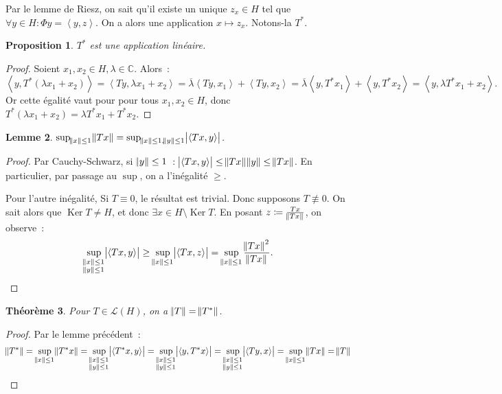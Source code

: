 \documentclass{report}
\DeclareMathOperator{\Ker}{Ker}
\newcommand{\C}{{\mathbb C}}
\newcommand{\scpr}[2]{\left\langle#1, #2\right\rangle}
\newtheorem{thm}{Théorème}[chapter]
\newtheorem{prp}[thm]{Proposition}
\newtheorem{lem}[thm]{Lemme}
\theoremstyle{definition}
\theoremstyle{remark}
\begin{document}
Par le lemme de Riesz, on sait qu'il existe un unique $z_x \in H$ tel que $\forall y \in H : \Phi y = \scpr y{z}$. On a alors une application $x \mapsto z_x$. Notons-la $T^*$.

\begin{prp} $T^*$ est une application linéaire.
\end{prp}

\begin{proof} Soient $x_1, x_2 \in H, \lambda \in \C$. Alors~:
\[\scpr y{T^*(\lambda x_1 + x_2)} = \scpr {Ty}{\lambda x_1 + x_2} = \overline \lambda \scpr {Ty}{x_1} + \scpr {Ty}{x_2} = \overline \lambda\scpr y{T^*x_1} + \scpr y{T^*x_2}
= \scpr y{\lambda T^*x_1 + x_2}.\]
Or cette égalité vaut pour pour tous $x_1, x_2 \in H$, donc $T^*(\lambda x_1 + x_2) = \lambda T^*x_1 + T^*x_2$.
\end{proof}

\begin{lem} $\sup_{\norm x \leq 1}\norm {Tx} = \sup_{\norm x \leq 1, \norm y \leq 1}\abs {\scpr {Tx}y}$.
\end{lem}

\begin{proof} Par Cauchy-Schwarz, si $\norm y \leq 1$~: $\abs {\scpr {Tx}y} \leq \norm {Tx}\norm y \leq \norm {Tx}$. En particulier, par passage au $\sup$, on a
l'inégalité $\geq$.

Pour l'autre inégalité, Si $T \equiv 0$, le résultat est trivial. Donc supposons $T \not \equiv 0$. On sait alors que $\Ker T \neq H$, et donc $\exists x \in H \setminus \Ker T$.
En posant $z \coloneqq \frac {Tx}{\norm {Tx}}$, on observe~:
\[\sup_{\substack {\norm x \leq 1 \\ \norm y \leq 1}}\abs {\scpr {Tx}y} \geq \sup_{\norm x \leq 1}\abs {\scpr {Tx}z} = \sup_{\norm x \leq 1}\frac {\norm {Tx}^2}{\norm {Tx}}.\]
\end{proof}

\begin{thm} Pour $T \in \mathcal L(H)$, on a $\norm T = \norm {T^*}$.
\end{thm}

\begin{proof} Par le lemme précédent~:
\[\norm {T^*} = \sup_{\norm x \leq 1}\norm {T^*x} = \sup_{\substack {\norm x \leq 1 \\ \norm y \leq 1}}\abs {\scpr {T^*x}y}
	= \sup_{\substack {\norm x \leq 1 \\ \norm y \leq 1}}\abs {\scpr y{T^*x}} = \sup_{\substack {\norm x \leq 1 \\ \norm y \leq 1}}\abs {\scpr {Ty}x}
	= \sup_{\norm x \leq 1}\norm {Tx} = \norm T\]
\end{proof}
\end{document}
